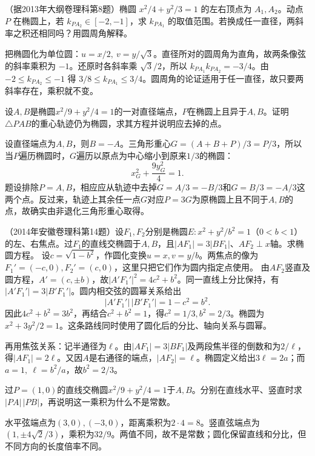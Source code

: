 （据2013年大纲卷理科第8题）椭圆 \(x^2/4+y^2/3=1\) 的左右顶点为 \(A_1,A_2\)。动点 \(P\) 在椭圆上，若 \(k_{PA_2}\in[-2,-1]\)，求 \(k_{PA_1}\) 的取值范围。若换成任一直径，两斜率之积还相同吗？用圆周角解释。
\par
\solutionanswer
把椭圆化为单位圆：\(u=x/2,\ v=y/\sqrt3\)。直径所对的圆周角为直角，故两条像弦的斜率乘积为 \(-1\)。还原时各斜率乘 \(\sqrt3/2\)，所以 \(k_{PA_1}k_{PA_2}=-3/4\)。由 \(-2\le k_{PA_2}\le-1\) 得 \(3/8\le k_{PA_1}\le3/4\)。圆周角的论证适用于任一直径，故只要两斜率存在，乘积就不变。


设\(A,B\)是椭圆\(x^2/9+y^2/4=1\)的一对直径端点，\(P\)在椭圆上且异于\(A,B\)。证明\(\triangle PAB\)的重心轨迹仍为椭圆，求其方程并说明应去掉的点。
\par
\solutionanswer
设直径端点为\(A,B\)，则\(B=-A\)。三角形重心\(G=(A+B+P)/3=P/3\)，所以当\(P\)遍历椭圆时，\(G\)遍历以原点为中心缩小到原来\(1/3\)的椭圆：
\[x_G^2+\frac{9y_G^2}{4}=1.\]
题设排除\(P=A,B\)，相应应从轨迹中去掉\(G=A/3=-B/3\)和\(G=B/3=-A/3\)这两个点。反过来，轨迹上其余任一点\(G\)对应\(P=3G\)为原椭圆上且不同于\(A,B\)的点，故确实由非退化三角形重心取得。


（2014年安徽卷理科第14题）设\(F_1,F_2\)分别是椭圆\(E:x^2+y^2/b^2=1\)（\(0<b<1\)）的左、右焦点。过\(F_1\)的直线交椭圆于\(A,B\)，且\(|AF_1|=3|BF_1|\)、\(AF_2\perp x\)轴。求椭圆方程。
\solutionanswer
设\(c=\sqrt{1-b^2}\)，作圆化变换\(u=x,v=y/b\)。两焦点的像为\(F_1'=(-c,0),F_2'=(c,0)\)，这里只把它们作为圆内指定点使用。
由\(AF_2\)竖直及圆方程，\(A'=(c,\pm b)\)，故\(|A'F_1'|^2=4c^2+b^2\)。同一直线上分比保持，有\(|A'F_1'|=3|B'F_1'|\)。圆内相交弦的圆幂关系给出
\[
 |A'F_1'|\,|B'F_1'|=1-c^2=b^2.
\]
因此\(4c^2+b^2=3b^2\)，再结合\(c^2+b^2=1\)，得\(c^2=1/3,b^2=2/3\)。椭圆为\(x^2+3y^2/2=1\)。这条路线同时使用了圆化后的分比、轴向关系与圆幂。

再用焦弦关系：记半通径为\(\ell\)。由\(|AF_1|=3|BF_1|\)及两段焦半径的倒数和为\(2/\ell\)，得\(|AF_1|=2\ell\)。又因\(A\)是右通径的端点，\(|AF_2|=\ell\)。椭圆定义给出\(3\ell=2a\)；而\(a=1,\ \ell=b^2/a\)，故\(b^2=2/3\)。


过\(P=(1,0)\)的直线交椭圆\(x^2/9+y^2/4=1\)于\(A,B\)。分别在直线水平、竖直时求\(|PA|\,|PB|\)，再说明这一乘积为什么不是常数。
\par
\solutionanswer
水平弦端点为\((3,0),(-3,0)\)，距离乘积为\(2\cdot4=8\)。竖直弦端点为\((1,\pm4\sqrt2/3)\)，乘积为\(32/9\)。两值不同，故不是常数；圆化保留直线和分比，但不同方向的长度倍率不同。


